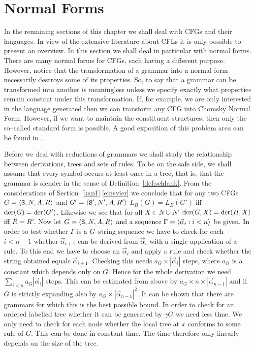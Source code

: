 \section{Normal Forms}
\label{zweizwei}
\label{kap2-2}
%
%
%
In the remaining sections of this chapter we shall deal with
CFGs and their languages. In view of the extensive
literature about CFLs it is only possible to
present an overview. In this section we shall deal in particular
with normal forms. There are many normal forms for CFGs,
each having a different purpose. However, notice that
the transformation of a grammar into a normal form necessarily
destroys some of its properties. So, to say that a grammar can
be transformed into another is meaningless unless we specify
exactly what properties remain constant under this transformation.
If, for example, we are only interested in the language generated
then we can transform any CFG into Chomsky Normal Form. However, 
if we want to maintain the constituent
structures, then only the so--called standard form is possible.
A good exposition of this problem area can be found in
\cite{miller:capacity}.

Before we deal with reductions of grammars we shall study the
relationship between derivations, trees and sets of rules.
To be on the safe side, we shall assume that every symbol
occurs at least once in a tree, that is, that the grammar is
slender in the sense of Definition~\ref{def:schlank}. From the 
considerations of Section~\ref{kap1}.\ref{einsvier} we conclude
that for any two CFGs $G = \langle \mbox{\tt S}, N, A, R\rangle$
and $G' = \langle \mbox{\tt S}', N', A, R'\rangle$ $L_B(G) = L_B(G')$ iff 
$\operatorname{der}(G) = \operatorname{der}(G')$. Likewise we
see that for all $X \in N \cup N'$ $\operatorname{der}(G,X) =
\operatorname{der}(H,X)$ iff $R = R'$. Now let
$G = \langle \mbox{\tt S}, N, A, R\rangle$ and  a sequence
$\Gamma = \langle \vec{\alpha}_i : i < n\rangle$ be given.
In order to test whether $\Gamma$ is a $G$--string sequence
we have to check for each $i < n-1$ whether $\vec{\alpha}_{i+1}$
can be derived from $\vec{\alpha}_i$ with a single application
of a rule. To this end we have to choose an $\vec{\alpha}_i$
and apply a rule and check whether the string obtained equals
$\vec{\alpha}_{i+1}$. Checking this needs $a_G \times |\vec{\alpha}_i|$
steps, where $a_G$ is a constant which depends only on $G$.
Hence for the whole derivation we need $\sum_{i < n} a_G |\vec{\alpha}_i|$
steps. This can be estimated from above by $a_G \times n \times
|\vec{\alpha}_{n-1}|$ and if $G$ is strictly expanding also by
$a_G \times |\vec{\alpha}_{n-1}|^2$. It can be shown that there are
grammars for which this is the best possible bound. In order to
check for an ordered labelled tree whether it can be generated
by $\gamma G$ we need less time. We only need to check for each node
whether the local tree at $x$ conforms to some rule of
$G$. This can be done in constant time. The time therefore only 
linearly depends on the size of the tree.

